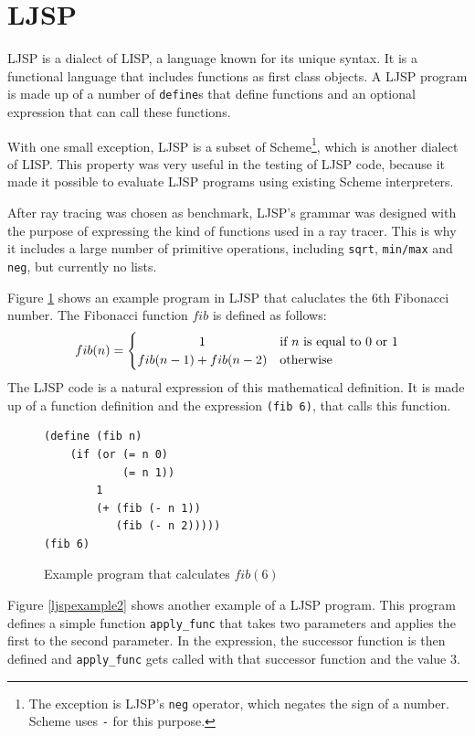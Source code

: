 \documentclass[11pt]{report}
\begin{document}
\section{LJSP}

LJSP is a dialect of LISP, a language known for its unique syntax. It is a functional language that includes functions as first class objects. A LJSP program is made up of a number of \texttt{define}s that define functions and an optional expression that can call these functions.

With one small exception, LJSP is a subset of Scheme\footnote{The exception is LJSP's \texttt{neg} operator, which negates the sign of a number. Scheme uses \texttt{-} for this purpose.}, which is another dialect of LISP. This property was very useful in the testing of LJSP code, because it made it possible to evaluate LJSP programs using existing Scheme interpreters.

After ray tracing was chosen as benchmark, LJSP's grammar was designed with the purpose of expressing the kind of functions used in a ray tracer. This is why it includes a large number of primitive operations, including \texttt{sqrt}, \texttt{min/max} and \texttt{neg}, but currently no lists.

Figure \ref{ljspexample} shows an example program in LJSP that caluclates the 6th Fibonacci number. The Fibonacci function $fib$ is defined as follows:
\[
 fib(n) =
  \begin{cases} 
      \hfill 1                   \hfill & \text{if $n$ is equal to $0$ or $1$} \\
      \hfill fib(n-1) + fib(n-2) \hfill & \text{otherwise} \\
  \end{cases}
\]
The LJSP code is a natural expression of this mathematical definition. It is made up of a function definition and the expression \texttt{(fib 6)}, that calls this function.
\begin{figure}[ht]
\begin{lstlisting}
(define (fib n) 
    (if (or (= n 0) 
            (= n 1)) 
        1 
        (+ (fib (- n 1)) 
           (fib (- n 2)))))
(fib 6)
\end{lstlisting}
\caption{Example program that calculates $fib(6)$}
\label{ljspexample}
\end{figure}



Figure \ref{ljspexample2} shows another example of a LJSP program. This program defines a simple function \texttt{apply_func} that takes two parameters and applies the first to the second parameter. In the expression, the successor function is then defined and \texttt{apply_func} gets called with that successor function and the value $3$.
\end{document}
